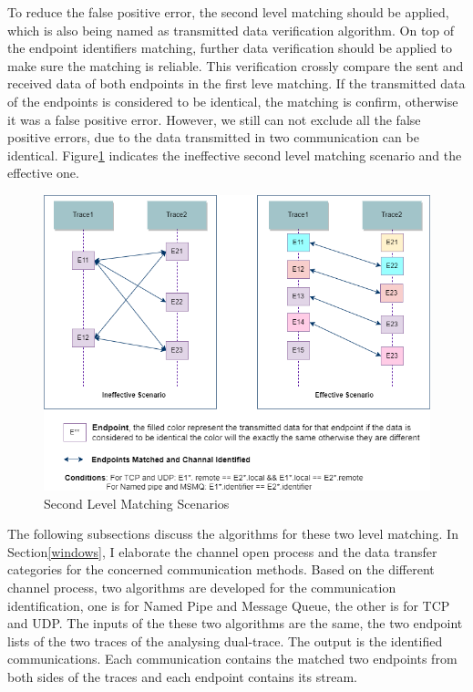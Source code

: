 To reduce the false positive error, the second level matching should be applied, which is also being named as transmitted data verification algorithm. On top of the endpoint identifiers matching, further data verification should be applied to make sure the matching is reliable. This verification crossly compare the sent and received data of both endpoints in the first leve matching. If the transmitted data of the endpoints is considered to be identical, the matching is confirm, otherwise it was a false positive error. However, we still can not exclude all the false positive errors, due to the data transmitted in two communication can be identical. Figure\ref{secondlevelmatching} indicates the ineffective second level matching scenario and the effective one.

\begin{figure}[H]
\centerline{\includegraphics[scale=0.55]{Figures/secondlevelmatching}}
 \caption{Second Level Matching Scenarios}
\label{secondlevelmatching}
\end{figure}


The following subsections discuss the algorithms for these two level matching. In Section\ref{windows}, I elaborate the channel open process and the data transfer categories for the concerned communication methods. Based on the different channel process, two algorithms are developed for the communication identification, one is for Named Pipe and Message Queue, the other is for TCP and UDP. The inputs of the these two algorithms are the same, the two endpoint lists of the two traces of the analysing dual-trace. The output is the identified communications. Each communication contains the matched two endpoints from both sides of the traces and each endpoint contains its stream.

